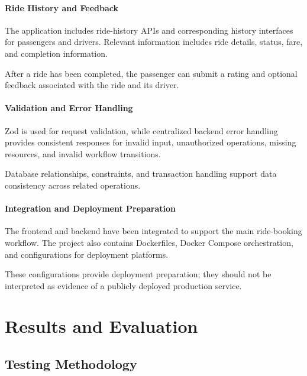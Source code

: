\documentclass{tietreport}
\begin{document}
\subsubsection*{Ride History and Feedback}

The application includes ride-history APIs and corresponding
history interfaces for passengers and drivers. Relevant
information includes ride details, status, fare, and
completion information.

After a ride has been completed, the passenger can submit
a rating and optional feedback associated with the ride
and its driver.

\subsubsection*{Validation and Error Handling}

Zod is used for request validation, while centralized
backend error handling provides consistent responses for
invalid input, unauthorized operations, missing resources,
and invalid workflow transitions.

Database relationships, constraints, and transaction handling
support data consistency across related operations.

\subsubsection*{Integration and Deployment Preparation}

The frontend and backend have been integrated to support
the main ride-booking workflow. The project also contains
Dockerfiles, Docker Compose orchestration, and configurations
for deployment platforms.

These configurations provide deployment preparation; they
should not be interpreted as evidence of a publicly deployed
production service.


\chapter{Results and Evaluation}

\section{Testing Methodology}
\end{document}
